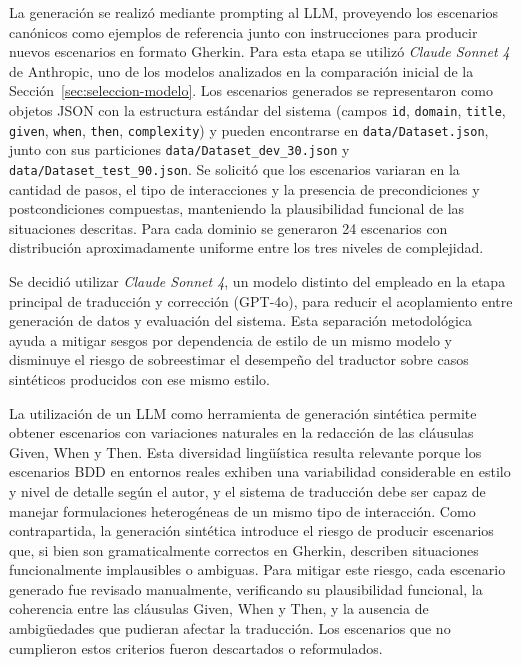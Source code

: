 La generación se realizó mediante prompting al LLM, proveyendo los escenarios canónicos como ejemplos de referencia junto con instrucciones para producir nuevos escenarios en formato Gherkin. Para esta etapa se utilizó \textit{Claude Sonnet 4} de Anthropic, uno de los modelos analizados en la comparación inicial de la Sección~\ref{sec:seleccion-modelo}. Los escenarios generados se representaron como objetos JSON con la estructura estándar del sistema (campos \texttt{id}, \texttt{domain}, \texttt{title}, \texttt{given}, \texttt{when}, \texttt{then}, \texttt{complexity}) y pueden encontrarse en \texttt{data/Dataset.json}, junto con sus particiones \texttt{data/Dataset\_dev\_30.json} y \texttt{data/Dataset\_test\_90.json}. Se solicitó que los escenarios variaran en la cantidad de pasos, el tipo de interacciones y la presencia de precondiciones y postcondiciones compuestas, manteniendo la plausibilidad funcional de las situaciones descritas. Para cada dominio se generaron 24 escenarios con distribución aproximadamente uniforme entre los tres niveles de complejidad.

Se decidió utilizar \textit{Claude Sonnet 4}, un modelo distinto del empleado en la etapa principal de traducción y corrección (GPT-4o), para reducir el acoplamiento entre generación de datos y evaluación del sistema. Esta separación metodológica ayuda a mitigar sesgos por dependencia de estilo de un mismo modelo y disminuye el riesgo de sobreestimar el desempeño del traductor sobre casos sintéticos producidos con ese mismo estilo.

La utilización de un LLM como herramienta de generación sintética permite obtener escenarios con variaciones naturales en la redacción de las cláusulas Given, When y Then. Esta diversidad lingüística resulta relevante porque los escenarios BDD en entornos reales exhiben una variabilidad considerable en estilo y nivel de detalle según el autor, y el sistema de traducción debe ser capaz de manejar formulaciones heterogéneas de un mismo tipo de interacción. Como contrapartida, la generación sintética introduce el riesgo de producir escenarios que, si bien son gramaticalmente correctos en Gherkin, describen situaciones funcionalmente implausibles o ambiguas. Para mitigar este riesgo, cada escenario generado fue revisado manualmente, verificando su plausibilidad funcional, la coherencia entre las cláusulas Given, When y Then, y la ausencia de ambigüedades que pudieran afectar la traducción. Los escenarios que no cumplieron estos criterios fueron descartados o reformulados.

